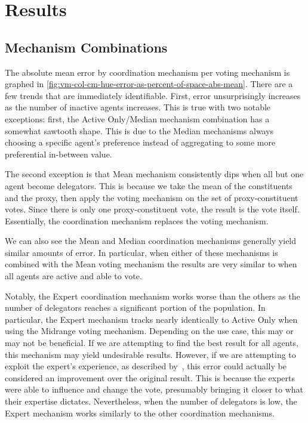 \section{Results}\label{sec:results}

\subsection{Mechanism Combinations}\label{subsec:mechanism-combinations}
The absolute mean error by coordination mechanism per voting mechanism is graphed in
\autoref{fig:vm-col-cm-hue-error-as-percent-of-space-abs-mean}.
There are a few trends that are immediately identifiable.
First, error unsurprisingly increases as the number of inactive agents increases.
This is true with two notable exceptions: first, the Active Only/Median
mechanism combination has a somewhat sawtooth shape.
This is due to the Median mechanisms always choosing a specific agent's preference
instead of aggregating to some more preferential in-between value.

The second exception is that Mean mechanism consistently dips when all but one agent
become delegators.
This is because we take the mean of the constituents and the proxy, then apply the
voting mechanism on the set of proxy-constituent votes.
Since there is only one proxy-constituent vote, the result is the vote itself.
Essentially, the coordination mechanism replaces the voting mechanism.

We can also see the Mean and Median coordination mechanisms generally yield similar
amounts of error.
In particular, when either of these mechanisms is combined with the Mean voting
mechanism the results are very similar to when all agents are active and able to vote.

Notably, the Expert coordination mechanism works worse than the others as the number
of delegators reaches a significant portion of the population.
In particular, the Expert mechanism tracks nearly identically to Active Only when
using the Midrange voting mechanism.
Depending on the use case, this may or may not be beneficial.
If we are attempting to find the best result for all agents, this mechanism may yield
undesirable results.
However, if we are attempting to exploit the expert's experience, as described
by~\cite{Miller1969}, this error could actually be considered an improvement over
the original result.
This is because the experts were able to influence and change the vote, presumably
bringing it closer to what their expertise dictates.
Nevertheless, when the number of delegators is low, the Expert mechanism works
similarly to the other coordination mechanisms.

